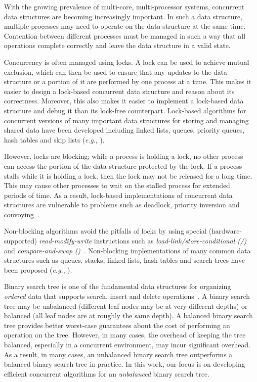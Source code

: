With the growing prevalence of multi-core, multi-processor systems, concurrent data structures are becoming increasingly important. In such a data structure, multiple processes may need to operate on the data structure at the same time. Contention between different processes must be managed in such a way that all operations complete correctly and leave the data structure in a valid state.

Concurrency is often managed using locks. A lock can be used to achieve mutual exclusion, which can then be used to ensure that any updates to the data structure or a portion of it are performed by one process at a time. This makes it easier to design a lock-based concurrent data structure and reason about its correctness. Moreover, this also makes it easier to implement a lock-based data structure and debug it than its lock-free counterpart. Lock-based algorithms for concurrent versions of many important data structures for storing and managing shared data have been developed including linked lists, queues, priority queues, hash tables and skip lists (\emph{e.g.}, \cite{MicSco:1996:PODC, Mic:2002:SPAA,Lea:2003:JSR166,HelHer+:2005:OPODIS,LevHer+:2007:SIROCCO, HerSha:2012:Book}).

However, locks are blocking; while a process is holding a lock, no other process can access the portion of the data structure protected by the lock. If a process stalls while it is holding a lock, then the lock may not be released for a long time. This may cause other processes to wait on the stalled process for extended periods of time. As a result, lock-based implementations of concurrent data structures are vulnerable to problems such as deadlock, priority inversion and convoying~\cite{HerSha:2012:Book}.

Non-blocking algorithms avoid the pitfalls of locks by using special (hardware-supported) \emph{read-modify-write} instructions such as \emph{load-link/store-conditional (\LL{}/\SC{})}  and \linebreak \emph{compare-and-swap (\CAS{})}~\cite{HerSha:2012:Book}. Non-blocking implementations of many common data structures such as queues, stacks, linked lists, hash tables and search trees  have been proposed (\emph{e.g.}, \cite{Mic:2002:SPAA,FomRup:2004:PODC,BenFin+:2005:SPAA,EllFat+:2010:PODC,HerSha:2012:Book,BraPet:2012:SPAA,HowJon:2012:SPAA,NatMit:2013:DISC,NatSav+:2013:SSS,NatMit:2014:PPoPP,DraVec+:2014:PPoPP,EllFat+:2014:PODC}).

Binary search tree is one of the fundamental data structures for organizing \emph{ordered} data that supports search, insert and delete operations~\cite{CorLei+:1991:MIT}. A binary search tree may be unbalanced (different leaf nodes may be at very different depths) or balanced (all leaf nodes are at roughly the same depth). A balanced binary search tree provides better worst-case guarantees about the cost of performing an operation on the tree. However, in many cases, the overhead of keeping the tree balanced, especially in a concurrent environment, may incur significant overhead. As a result, in many cases, an unbalanced binary search tree  outperforms a balanced binary search tree in practice. In this work, our focus is on developing efficient concurrent algorithms for an \emph{unbalanced} binary search tree. 

